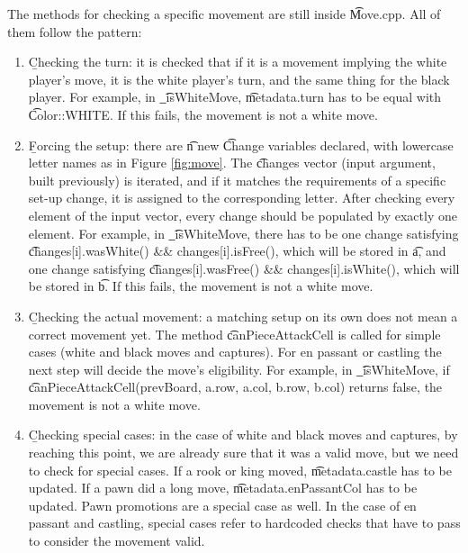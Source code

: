 The methods for checking a specific movement are still inside \t{Move.cpp}. All of them follow the pattern:
\begin{enumerate}
    \item \b{Checking the turn}: it is checked that if it is a movement implying the white player's move, it is the white player's turn, and the same thing for the black player. For example, in \t{\_isWhiteMove}, \t{metadata.turn} has to be equal with \t{Color::WHITE}. If this fails, the movement is not a white move.
    
    \item \b{Forcing the setup}: there are \t{n} new \t{Change} variables declared, with lowercase letter names as in Figure \ref{fig:move}. The \t{changes} vector (input argument, built previously) is iterated, and if it matches the requirements of a specific set-up change, it is assigned to the corresponding letter. After checking every element of the input vector, every change should be populated by exactly one element. For example, in \t{\_isWhiteMove}, there has to be one change satisfying \t{changes[i].wasWhite() \&\& changes[i].isFree()}, which will be stored in \t{a}, and one change satisfying \t{changes[i].wasFree() \&\& changes[i].isWhite()}, which will be stored in \t{b}. If this fails, the movement is not a white move.
    
    \item \b{Checking the actual movement}: a matching setup on its own does not mean a correct movement yet. The method \t{canPieceAttackCell} is called for simple cases (white and black moves and captures). For en passant or castling the next step will decide the move's eligibility. For example, in \t{\_isWhiteMove}, if \t{canPieceAttackCell(prevBoard, a.row, a.col, b.row, b.col)} returns false, the movement is not a white move.
    
    \item \b{Checking special cases}: in the case of white and black moves and captures, by reaching this point, we are already sure that it was a valid move, but we need to check for special cases. If a rook or king moved, \t{metadata.castle} has to be updated. If a pawn did a long move, \t{metadata.enPassantCol} has to be updated. Pawn promotions are a special case as well. In the case of en passant and castling, special cases refer to hardcoded checks that have to pass to consider the movement valid.

\end{enumerate}
\vspace{0.5cm}

